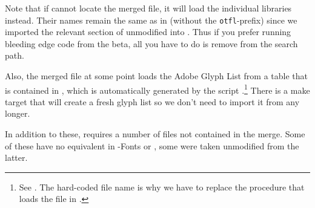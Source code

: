Note that if  cannot locate the
merged file, it will load the individual \LUA libraries
instead.
%
Their names remain the same as in \CONTEXT (without the
\verb|otfl|-prefix) since we imported the relevant section of
 unmodified into .
Thus if you prefer running bleeding edge code from the
\CONTEXT beta, all you have to do is remove
 from the search path.

Also, the merged file at some point loads the Adobe Glyph List from a
\LUA table that is contained in ,
which is automatically generated by the script
.\footnote{%
  See .
  The hard-coded file name is why we have to replace the procedure
  that loads the file in .
}
There is a make target  that will create a fresh
glyph list so we don’t need to import it from \CONTEXT any longer.

In addition to these,  requires a number of
files not contained in the merge. Some of these have no equivalent in
\LUATEX-Fonts or \CONTEXT, some were taken unmodified from the latter.


